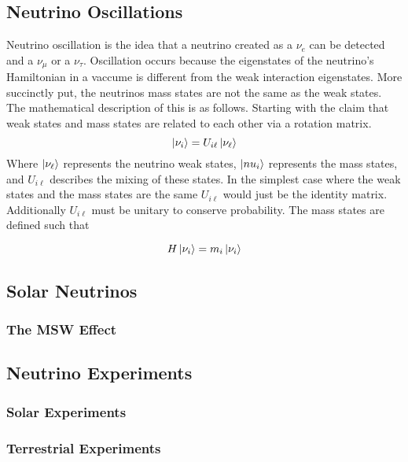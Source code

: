 \subsection{Neutrino Oscillations}
Neutrino oscillation is the idea that a neutrino created as a $\nu_e$ can be
detected and a $\nu_\mu$ or a $\nu_\tau$.
Oscillation occurs because the eigenstates of the neutrino's Hamiltonian in a
vaccume is different from the weak interaction eigenstates.
More succinctly put, the neutrinos mass states are not the same as
the weak states.
The mathematical description of this is as follows.
Starting with the claim that weak states and mass states are related to
each other via a rotation matrix.
\begin{equation}
    \ket{\nu_{i}} = U_{i\ell}\ket{\nu_\ell}
\end{equation}
Where $\ket{\nu_\ell}$ represents the neutrino weak states, $\ket{nu_i}$
represents the mass states, and $U_{i\ell}$ describes the mixing of these
states.
In the simplest case where the weak states and the mass states are the same
$U_{i\ell}$ would just be the identity matrix.
Additionally $U_{i\ell}$ must be unitary to conserve probability.
The mass states are defined such that

\begin{equation}
    H \ket{\nu_i} = m_i \ket{\nu_i}
\end{equation}

\subsection{Solar Neutrinos}
\subsubsection{The MSW Effect}
\subsection{Neutrino Experiments}
\subsubsection{Solar Experiments}
\subsubsection{Terrestrial Experiments}


